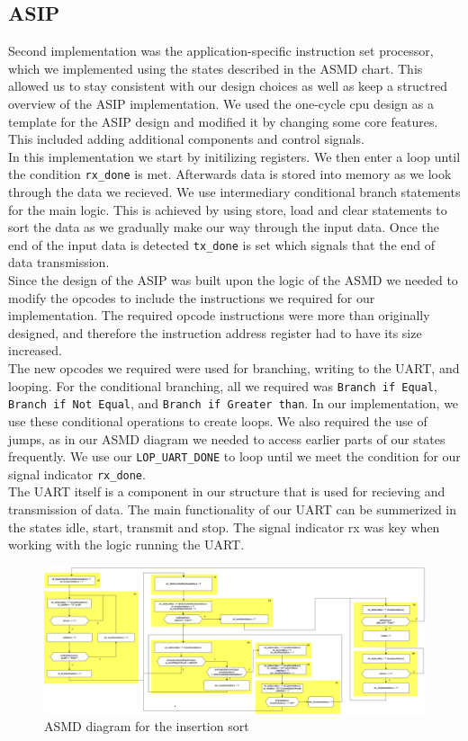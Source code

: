 \documentclass[conference]{IEEEtran}
\begin{document}
\subsection{ASIP}
Second implementation was the application-specific instruction set processor, which we implemented using the states described in the ASMD chart. This allowed us to stay consistent with our design choices as well as keep a structred overview of the ASIP implementation. We used the one-cycle cpu design as a template for the ASIP design and modified it by changing some core features. This included adding additional components and control signals.\\
In this implementation we start by initilizing registers. We then enter a loop until the condition \texttt{rx\_done} is met. Afterwards data is stored into memory as we look through the data we recieved. We use intermediary conditional branch statements for the main logic. This is achieved by using store, load and clear statements to sort the data as we gradually make our way through the input data. Once the end of the input data is detected \texttt{tx\_done} is set which signals that the end of data transmission.\\
Since the design of the ASIP was built upon the logic of the ASMD we needed to modify the opcodes to include the instructions we required for our implementation. The required opcode instructions were more than originally designed, and therefore the instruction address register had to have its size increased.\\
The  new opcodes we required were used for branching, writing to the UART, and looping. For the conditional branching, all we required was \texttt{Branch if Equal}, \texttt{Branch if Not Equal}, and \texttt{Branch if Greater than}. In our implementation, we use these conditional operations to create loops. We also required the use of jumps, as in our ASMD diagram we needed to access earlier parts of our states frequently. We use our \texttt{LOP\_UART\_DONE} to loop until we meet the condition for our signal indicator \texttt{rx\_done}.\\
The UART itself is a component in our structure that is used for recieving and transmission of data. The main functionality of our UART can be summerized in the states idle, start, transmit and stop. The signal indicator rx was key when working with the logic running the UART.

\begin{figure}
    \centering
    \includegraphics[width=1\linewidth]{Images/ASMDInsertionSort.png}
    \caption{ASMD diagram for the insertion sort}
    \label{fig:asmd}
\end{figure}
\end{document}
